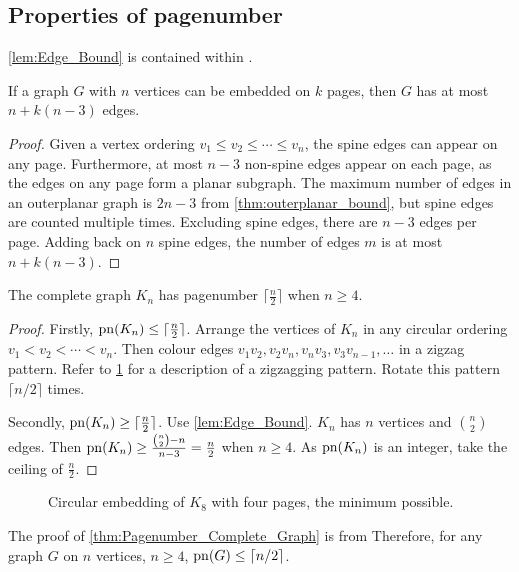 \subsection{Properties of pagenumber}\label{ssec:Related_Properties}
\cref{lem:Edge_Bound} is contained within \textcite{bernhartBookThicknessGraph1979}.
\begin{proposition}\label{lem:Edge_Bound}
	If a graph \(G\) with $n$ vertices can be embedded on $k$ pages, then \(G\) has at most \(n + k(n-3)\) edges.
\end{proposition}
\begin{proof}
	Given a vertex ordering \(v_1 \leq v_2 \leq \cdots \leq v_n\), the spine edges can appear on any page. Furthermore, at most \(n-3\) non-spine edges appear on each page, as the edges on any page form a planar subgraph. The maximum number of edges in an outerplanar graph is \(2n - 3\) from \cref{thm:outerplanar_bound}, but spine edges are counted multiple times. Excluding spine edges, there are $n-3$ edges per page. Adding back on $n$ spine edges, the number of edges $m$ is at most $n + k (n - 3)$.
\end{proof}
\begin{proposition}\label{thm:Pagenumber_Complete_Graph}
	The complete graph $K_n$ has pagenumber $\lceil \frac{n}{2} \rceil$ when $n \geq 4$.
\end{proposition}
\begin{proof}
	Firstly, $\operatorname{pn}(K_n) \leq \lceil \frac{n}{2} \rceil$. Arrange the vertices of $K_n$ in any circular ordering $v_1 < v_2 < \cdots < v_n$. Then colour edges $v_1 v_2, v_2 v_{n}, v_{n} v_{3}, v_{3} v_{n-1}, \ldots$ in a zigzag pattern. Refer to \cref{fig:k8 coloured with colours} for a description of a zigzagging pattern. Rotate this pattern $\lceil n/2 \rceil$ times. 

	Secondly, $\operatorname{pn}(K_n) \geq \lceil \frac{n}{2} \rceil$. Use \cref{lem:Edge_Bound}. \(K_n\) has \(n\) vertices and \(\binom{n}{2}\) edges. Then \(\operatorname{pn}(K_n) \geq \frac{\binom{n}{2} - n}{n - 3} = \frac{n}{2}\) when \(n \geq 4\). As \(\operatorname{pn}(K_n)\) is an integer, take the ceiling of \(\frac{n}{2}\).
\end{proof}
\begin{figure}[ht]
	\centering
	
	\caption[Embedding $K_8$ on four pages]{Circular embedding of \(K_8\) with four pages, the minimum possible.}\label{fig:k8 coloured with colours}
\end{figure}
The proof of \cref{thm:Pagenumber_Complete_Graph} is from \textcite{bernhartBookThicknessGraph1979}
Therefore, for any graph \(G\) on \(n\) vertices, \(n \geq 4\), \(\operatorname{pn}(G) \leq \lceil n/2 \rceil\).

